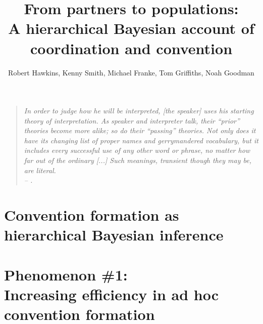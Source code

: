 \documentclass[11pt, floatsintext]{apa6}
\title{From partners to populations: \\[.1em] A hierarchical Bayesian account of coordination and convention}
\author{Robert Hawkins, Kenny Smith, Michael Franke, Tom Griffiths, Noah Goodman}
\affiliation{University}
\begin{document}
\maketitle

\begin{quote}
\emph{In order to judge how he will be interpreted, [the speaker] uses his starting theory of interpretation. %
As speaker and interpreter talk, their ``prior'' theories become more alike; so do their ``passing'' theories. 
Not only does it have its changing list of proper names and gerrymandered vocabulary, but it includes every successful use of any other word or phrase, no matter how far out of the ordinary [...] 
Such meanings, transient though they may be, are literal. \\-- .}

\end{quote}



\section{Convention formation as\\ hierarchical Bayesian inference}



\section{Phenomenon \#1: \\ Increasing efficiency in ad hoc convention formation}
\end{document}
